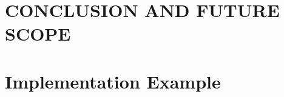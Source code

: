 \documentclass[12pt]{report}
\begin{document}
\chapter{CONCLUSION AND FUTURE SCOPE}




%

\appendix
\chapter{Implementation Example}

 

\cite{gitkey}
\cite{latexkey}
\cite{doxygenkey}
\end{document}
